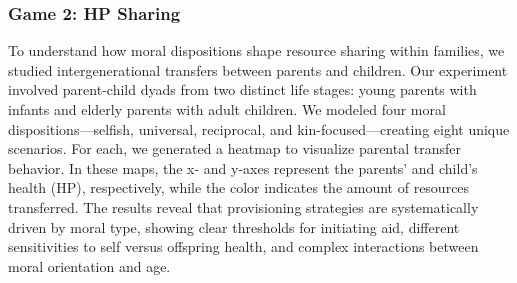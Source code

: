 
\subsubsection{Game 2: HP Sharing}


To understand how moral dispositions shape resource sharing within families, we studied intergenerational transfers between parents and children. Our experiment involved parent-child dyads from two distinct life stages: young parents with infants and elderly parents with adult children. We modeled four moral dispositions—selfish, universal, reciprocal, and kin-focused—creating eight unique scenarios. For each, we generated a heatmap to visualize parental transfer behavior. In these maps, the x- and y-axes represent the parents' and child's health (HP), respectively, while the color indicates the amount of resources transferred. The results reveal that provisioning strategies are systematically driven by moral type, showing clear thresholds for initiating aid, different sensitivities to self versus offspring health, and complex interactions between moral orientation and age.

